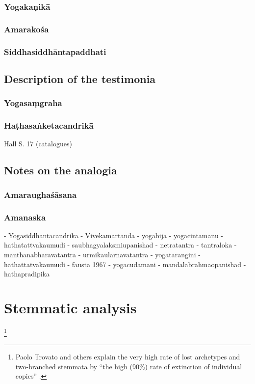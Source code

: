 \subsubsection{Yogakaṇikā}

\subsubsection{Amarakośa}

\subsubsection{Siddhasiddhāntapaddhati}

\subsection{Description of the testimonia}

\subsubsection{Yogasaṃgraha}
\label{yogasamgraha}
\subsubsection{Haṭhasaṅketacandrikā}
\label{hathacandrika}
Hall S. 17 (catalogues) 

\subsection{Notes on the analogia}

\subsubsection{Amaraughaśāsana}
\subsubsection{Amanaska}

- Yogasiddhāntacandrikā
- Vivekamartanda
- yogabija
- yogacintamanu
- hathatattvakaumudi
- saubhagyalaksmiupanishad
- netratantra
- tantraloka
-manthanabharavatantra
- urmikaularnavatantra
- yogatarangini
- hathattatvakaumudi
- fausta 1967
- yogacudamani
- mandalabrahmaopanishad
- hathapradipika 

\section{Stemmatic analysis}
\label{stemma}
\footnote{Paolo Trovato and others explain the very high rate of lost archetypes and two-branched stemmata by ``the high (90\%) rate of extinction of individual copies'' \parencite[86]{trovato2017}.}

